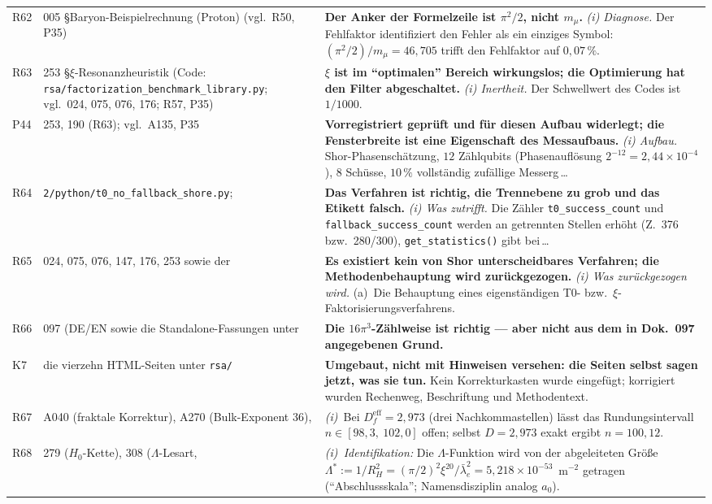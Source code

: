 \begin{longtable}{@{}p{0.9cm}p{3.1cm}p{10.2cm}@{}}
R62 & 005 \S{}Baryon-Beispielrechnung (Proton) (vgl.\ R50, P35) & \textbf{Der Anker der Formelzeile ist $\pi^2/2$, nicht $m_\mu$.} \emph{(i) Diagnose.} Der Fehlfaktor identifiziert den Fehler als ein einziges Symbol: $(\pi^2/2)/m_\mu = 46{,}705$ trifft den Fehlfaktor auf $0{,}07\,\%$. \\
R63 & 253 \S{}$\xi$-Resonanzheuristik (Code: \texttt{rsa/\allowbreak factorization\_\allowbreak benchmark\_\allowbreak library.py}; vgl.\ 024, 075, 076, 176; R57, P35) & \textbf{$\xi$ ist im \enquote{optimalen} Bereich wirkungslos; die Optimierung hat den Filter abgeschaltet.} \emph{(i) Inertheit.} Der Schwellwert des Codes ist $1/1000$. \\
P44 & 253, 190 (R63); vgl.\ A135, P35 & \textbf{Vorregistriert geprüft und für diesen Aufbau widerlegt; die Fensterbreite ist eine Eigenschaft des Messaufbaus.} \emph{(i) Aufbau.} Shor-Phasenschätzung, $12$ Zählqubits (Phasenauflösung $2^{-12} = 2{,}44\times10^{-4}$), $8$ Schüsse, $10\,\%$ vollständig zufällige Messerg\,\ldots \\
R64 & \texttt{2/python/t0\_no\_fallback\_shore.py}; & \textbf{Das Verfahren ist richtig, die Trennebene zu grob und das Etikett falsch.} \emph{(i) Was zutrifft.} Die Zähler \texttt{t0\_success\_count} und \texttt{fallback\_success\_count} werden an getrennten Stellen erhöht (Z.~376 bzw.\ 280/300), \texttt{get\_statistics()} gibt bei\,\ldots \\
R65 & 024, 075, 076, 147, 176, 253 sowie der & \textbf{Es existiert kein von Shor unterscheidbares Verfahren; die Methodenbehauptung wird zurückgezogen.} \emph{(i) Was zurückgezogen wird.} (a)~Die Behauptung eines eigenständigen T0- bzw.\ $\xi$-Faktorisierungsverfahrens. \\
R66 & 097 (DE/EN sowie die Standalone-Fassungen unter & \textbf{Die $16\pi^3$-Zählweise ist richtig --- aber nicht aus dem in Dok.~097 angegebenen Grund.} \\
K7 & die vierzehn HTML-Seiten unter \texttt{rsa/} & \textbf{Umgebaut, nicht mit Hinweisen versehen: die Seiten selbst sagen jetzt, was sie tun.} Kein Korrekturkasten wurde eingefügt; korrigiert wurden Rechenweg, Beschriftung und Methodentext. \\
R67 & A040 (fraktale Korrektur), A270 (Bulk-Exponent 36), & \emph{(i)}~Bei $D_f^\text{eff} = 2{,}973$ (drei Nachkommastellen) lässt das Rundungsintervall $n \in [98{,}3,\ 102{,}0]$ offen; selbst $D = 2{,}973$ exakt ergibt $n = 100{,}12$. \\
R68 & 279 ($H_0$-Kette), 308 ($\Lambda$-Lesart, & \emph{(i)~Identifikation:} Die $\Lambda$-Funktion wird von der abgeleiteten Größe $\Lambda^{*} := 1/R_H^2 = (\pi/2)^2\xi^{20}/ \bar\lambda_e^2 = 5{,}218\times10^{-53}$~m$^{-2}$ getragen (\enquote{Abschlussskala}; Namensdisziplin analog $a_0$). \\

\end{longtable}
